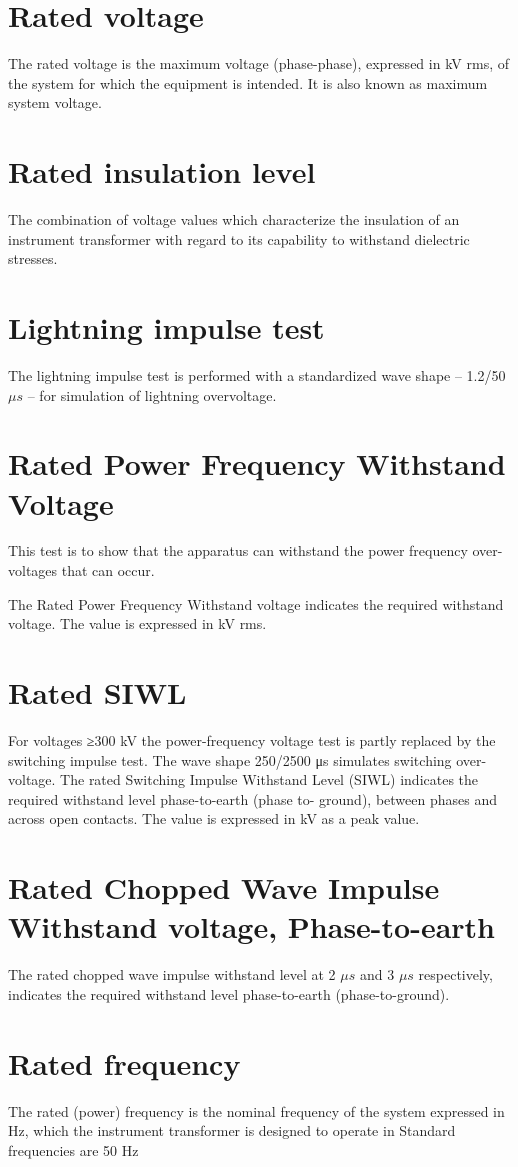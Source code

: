 \section*{Rated voltage}
The rated voltage is the maximum voltage (phase-phase), expressed in kV rms, of the system for which the equipment is intended. It is also known as maximum system voltage.

\section*{Rated insulation level}
The combination of voltage values which characterize the insulation of an instrument transformer with regard to its capability to withstand dielectric stresses.
\section*{Lightning impulse test}
The lightning impulse test is performed with a standardized wave shape – 1.2/50 $\mu s$ – for simulation of lightning overvoltage.
\section*{Rated Power Frequency Withstand Voltage}
This test is to show that the apparatus can withstand the power frequency over-voltages that can occur.

The Rated Power Frequency Withstand voltage indicates the required withstand voltage. The value is expressed in kV rms.

\section*{Rated SIWL}
For voltages ≥300 kV the power-frequency voltage test is partly replaced by the switching impulse test. The wave shape 250/2500 μs simulates switching over-voltage. The rated Switching Impulse Withstand Level (SIWL) indicates the required withstand level phase-to-earth (phase to- ground), between phases and across open contacts. The value is expressed in kV as a peak value.
\section*{Rated Chopped Wave Impulse Withstand voltage, Phase-to-earth}
The rated chopped wave impulse withstand level at 2 $\mu s$ and 3 $\mu s$ respectively, indicates the required withstand level phase-to-earth (phase-to-ground).

\section*{Rated frequency}
The rated (power) frequency is the nominal frequency of the system expressed in Hz, which the instrument transformer is designed to operate in Standard frequencies are 50 Hz 

